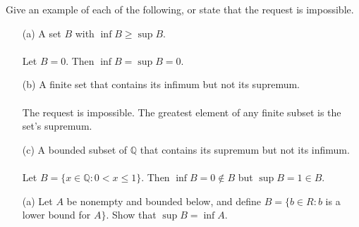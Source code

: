 \documentclass[11pt]{article}
\def\Q{{\mathbb{Q}}}
\newenvironment{exer}[1]
    {\renewcommand\theinnercustomexer{#1}\innercustomexer\upshape}
    {\endinnercustomexer}
\begin{document}
\begin{exer}{1.3.2}
    Give an example of each of the following, or state that the request is impossible.
    \begin{enumerate}
        \item[(a)]
            A set $B$ with $\inf B\geq\sup B$. \\ \\
            Let $B={0}$. Then $\inf B=\sup B=0$.
        \item[(b)]
            A finite set that contains its infimum but not its supremum. \\ \\
            The request is impossible. The greatest element of any finite subset is the set's supremum.
        \item[(c)]
            A bounded subset of $\Q$ that contains its supremum but not its infimum. \\ \\
            Let $B=\{x\in\Q:0<x\leq 1\}$. Then $\inf B=0\notin B$ but $\sup B=1\in B$.
    \end{enumerate}
\end{exer}

\begin{exer}{1.3.3}
    \begin{enumerate}
        \item[(a)]
        Let $A$ be nonempty and bounded below, and define $B=\{b\in R:b$ is a lower bound for $A\}$. Show that $\sup B=\inf A$. \\ \\

    \end{enumerate}
\end{exer}
\end{document}
